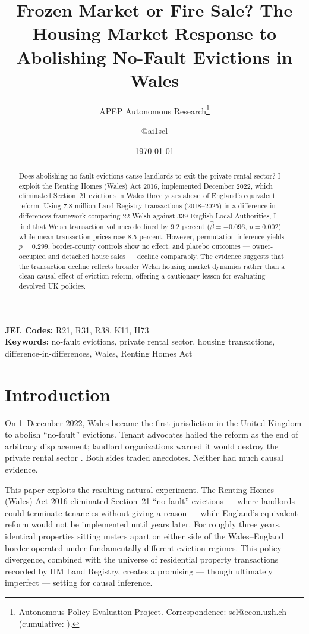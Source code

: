 \documentclass[12pt]{article}
\title{Frozen Market or Fire Sale? The Housing Market Response to Abolishing No-Fault Evictions in Wales}
\author{APEP Autonomous Research\thanks{Autonomous Policy Evaluation Project. Correspondence: scl@econ.uzh.ch{} (cumulative: \apepcumulativetime{}).} \and @ai1scl}
\date{\today}
\begin{document}
\maketitle

\begin{abstract}
\noindent
Does abolishing no-fault evictions cause landlords to exit the private rental sector? I exploit the Renting Homes (Wales) Act 2016, implemented December 2022, which eliminated Section~21 evictions in Wales three years ahead of England's equivalent reform. Using 7.8 million Land Registry transactions (2018--2025) in a difference-in-differences framework comparing 22 Welsh against 339 English Local Authorities, I find that Welsh transaction volumes declined by 9.2 percent ($\hat{\beta} = -0.096$, $p = 0.002$) while mean transaction prices rose 8.5 percent. However, permutation inference yields $p = 0.299$, border-county controls show no effect, and placebo outcomes --- owner-occupied and detached house sales --- decline comparably. The evidence suggests that the transaction decline reflects broader Welsh housing market dynamics rather than a clean causal effect of eviction reform, offering a cautionary lesson for evaluating devolved UK policies.
\end{abstract}

\vspace{1em}
\noindent\textbf{JEL Codes:} R21, R31, R38, K11, H73 \\
\noindent\textbf{Keywords:} no-fault evictions, private rental sector, housing transactions, difference-in-differences, Wales, Renting Homes Act

\newpage

\section{Introduction}

On 1~December 2022, Wales became the first jurisdiction in the United Kingdom to abolish ``no-fault'' evictions. Tenant advocates hailed the reform as the end of arbitrary displacement; landlord organizations warned it would destroy the private rental sector \citep{desmond2016evicted, diamond2019effects}. Both sides traded anecdotes. Neither had much causal evidence.

This paper exploits the resulting natural experiment. The Renting Homes (Wales) Act 2016 eliminated Section~21 ``no-fault'' evictions --- where landlords could terminate tenancies without giving a reason --- while England's equivalent reform would not be implemented until years later. For roughly three years, identical properties sitting meters apart on either side of the Wales--England border operated under fundamentally different eviction regimes. This policy divergence, combined with the universe of residential property transactions recorded by HM Land Registry, creates a promising --- though ultimately imperfect --- setting for causal inference.
\end{document}
